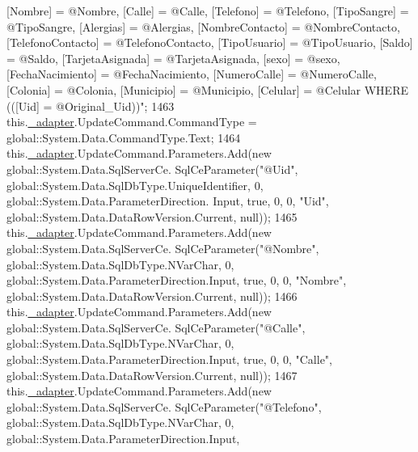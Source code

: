 \begin{DoxyCode}
{       [Nombre] = @Nombre, [Calle] = @Calle, [Telefono] = @Telefono, [TipoSangre] = @TipoSangre, [Alergias] = @Alergias,
       [NombreContacto] = @NombreContacto, [TelefonoContacto] = @TelefonoContacto, [TipoUsuario] = @TipoUsuario,
       [Saldo] = @Saldo, [TarjetaAsignada] = @TarjetaAsignada, [sexo] = @sexo, [FechaNacimiento] = @FechaNacimiento,
       [NumeroCalle] = @NumeroCalle, [Colonia] = @Colonia, [Municipio] = @Municipio, [Celular] = @Celular WHERE
       (([Uid] = @Original\_Uid))"};
1463             this.\hyperlink{class_proyecto___integrador__3_1_1ds_usuarios_table_adapters_1_1_usuarios_table_adapter_ab48b9b83ce2db01dbbc83ad45b428a80}{\_adapter}.UpdateCommand.CommandType = global::System.Data.CommandType.Text;
1464             this.\hyperlink{class_proyecto___integrador__3_1_1ds_usuarios_table_adapters_1_1_usuarios_table_adapter_ab48b9b83ce2db01dbbc83ad45b428a80}{\_adapter}.UpdateCommand.Parameters.Add(\textcolor{keyword}{new} global::System.Data.SqlServerCe.
      SqlCeParameter(\textcolor{stringliteral}{"@Uid"}, global::System.Data.SqlDbType.UniqueIdentifier, 0, global::System.Data.ParameterDirection.
      Input, \textcolor{keyword}{true}, 0, 0, \textcolor{stringliteral}{"Uid"}, global::System.Data.DataRowVersion.Current, null));
1465             this.\hyperlink{class_proyecto___integrador__3_1_1ds_usuarios_table_adapters_1_1_usuarios_table_adapter_ab48b9b83ce2db01dbbc83ad45b428a80}{\_adapter}.UpdateCommand.Parameters.Add(\textcolor{keyword}{new} global::System.Data.SqlServerCe.
      SqlCeParameter(\textcolor{stringliteral}{"@Nombre"}, global::System.Data.SqlDbType.NVarChar, 0, global::System.Data.ParameterDirection.Input, \textcolor{keyword}{
      true}, 0, 0, \textcolor{stringliteral}{"Nombre"}, global::System.Data.DataRowVersion.Current, null));
1466             this.\hyperlink{class_proyecto___integrador__3_1_1ds_usuarios_table_adapters_1_1_usuarios_table_adapter_ab48b9b83ce2db01dbbc83ad45b428a80}{\_adapter}.UpdateCommand.Parameters.Add(\textcolor{keyword}{new} global::System.Data.SqlServerCe.
      SqlCeParameter(\textcolor{stringliteral}{"@Calle"}, global::System.Data.SqlDbType.NVarChar, 0, global::System.Data.ParameterDirection.Input, \textcolor{keyword}{
      true}, 0, 0, \textcolor{stringliteral}{"Calle"}, global::System.Data.DataRowVersion.Current, null));
1467             this.\hyperlink{class_proyecto___integrador__3_1_1ds_usuarios_table_adapters_1_1_usuarios_table_adapter_ab48b9b83ce2db01dbbc83ad45b428a80}{\_adapter}.UpdateCommand.Parameters.Add(\textcolor{keyword}{new} global::System.Data.SqlServerCe.
      SqlCeParameter(\textcolor{stringliteral}{"@Telefono"}, global::System.Data.SqlDbType.NVarChar, 0, global::System.Data.ParameterDirection.Input,

\end{DoxyCode}
